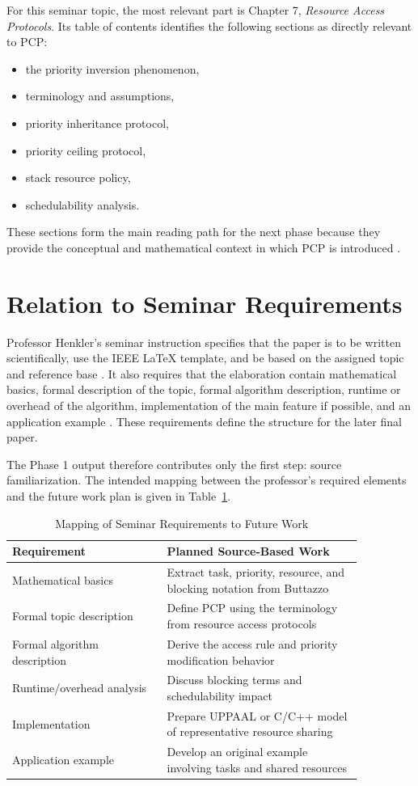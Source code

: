 \documentclass[conference]{IEEEtran}
\begin{document}
For this seminar topic, the most relevant part is Chapter 7, \emph{Resource Access Protocols}. Its table of contents identifies the following sections as directly relevant to PCP:
\begin{itemize}
    \item the priority inversion phenomenon,
    \item terminology and assumptions,
    \item priority inheritance protocol,
    \item priority ceiling protocol,
    \item stack resource policy,
    \item schedulability analysis.
\end{itemize}
These sections form the main reading path for the next phase because they provide the conceptual and mathematical context in which PCP is introduced \cite{Buttazzo2011}.

\section{Relation to Seminar Requirements}
Professor Henkler's seminar instruction specifies that the paper is to be written scientifically, use the IEEE LaTeX template, and be based on the assigned topic and reference base \cite{HenklerSeminar2026}. It also requires that the elaboration contain mathematical basics, formal description of the topic, formal algorithm description, runtime or overhead of the algorithm, implementation of the main feature if possible, and an application example \cite{HenklerSeminar2026}. These requirements define the structure for the later final paper.

The Phase 1 output therefore contributes only the first step: source familiarization. The intended mapping between the professor's required elements and the future work plan is given in Table~\ref{tab:mapping}.

\begin{table}[htbp]
\caption{Mapping of Seminar Requirements to Future Work}
\label{tab:mapping}
\centering
\begin{tabular}{p{0.38\linewidth}p{0.48\linewidth}}
\toprule
\textbf{Requirement} & \textbf{Planned Source-Based Work} \\
\midrule
Mathematical basics & Extract task, priority, resource, and blocking notation from Buttazzo \\
Formal topic description & Define PCP using the terminology from resource access protocols \\
Formal algorithm description & Derive the access rule and priority modification behavior \\
Runtime/overhead analysis & Discuss blocking terms and schedulability impact \\
Implementation & Prepare UPPAAL or C/C++ model of representative resource sharing \\
Application example & Develop an original example involving tasks and shared resources \\
\bottomrule
\end{tabular}
\end{table}
\end{document}
